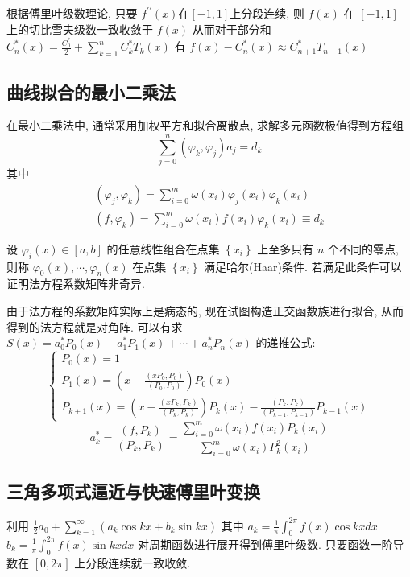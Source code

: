 \documentclass[10pt]{yerbaformat}
\begin{document}
\par 根据傅里叶级数理论, 只要 $f^{\prime \prime}(x)$在$[-1,1]$上分段连续, 则 $f(x)$ 在 $[-1,1]$ 上的切比雪夫级数一致收敛于 $f(x)$ 从而对于部分和 $C_{n}^{*}(x)=\frac{C_{0}^{*}}{2}+\sum_{k=1}^{n} C_{k}^{*} T_{k}(x)$ 有 $f(x)-C_{n}^{*}(x) \approx C_{n+1}^{*} T_{n+1}(x)$

\subsection{曲线拟合的最小二乘法}
\par 在最小二乘法中, 通常采用加权平方和拟合离散点, 求解多元函数极值得到方程组
$$
    \sum_{j=0}^{n}\left(\varphi_{k}, \varphi_{j}\right) a_{j}=d_{k}
$$
其中
$$
    \begin{array}{l}
        \left(\varphi_{j}, \varphi_{k}\right)=\sum_{i=0}^{m} \omega\left(x_{i}\right) \varphi_{j}\left(x_{i}\right) \varphi_{k}\left(x_{i}\right) \\
        \left(f, \varphi_{k}\right)=\sum_{i=0}^{m} \omega\left(x_{i}\right) f\left(x_{i}\right) \varphi_{k}\left(x_{i}\right) \equiv d_{k}
    \end{array}
$$
\begin{definition}
    设 $\varphi_{i}(x) \in[a, b]$ 的任意线性组合在点集 $\left\{x_{i}\right\}$ 上至多只有 $n$ 个不同的零点, 则称 $\varphi_{0}(x), \cdots, \varphi_{n}(x)$ 在点集
    $\left\{x_{i}\right\}$ 满足哈尔(Haar)条件. 若满足此条件可以证明法方程系数矩阵非奇异.
\end{definition}

\par 由于法方程的系数矩阵实际上是病态的, 现在试图构造正交函数族进行拟合, 从而得到的法方程就是对角阵. 可以有求 $S(x)=a_{0}^{*} P_{0}(x)+a_{1}^{*} P_{1}(x)+\cdots+a_{n}^{*} P_{n}(x)$ 的递推公式:
$$
    \left\{\begin{array}{l}
        P_{0}(x)=1                                                                                     \\
        P_{1}(x)=\left(x-\frac{\left(x P_{0}, P_{0}\right)}{\left(P_{0}, P_{0}\right)}\right) P_{0}(x) \\
        P_{k+1}(x)=\left(x-\frac{\left(x P_{k}, P_{k}\right)}{\left(P_{k}, P_{k}\right)}\right) P_{k}(x)-\frac{\left(P_{k}, P_{k}\right)}{\left(P_{k-1}, P_{k-1}\right)} P_{k-1}(x)
    \end{array}\right.
$$
$$
    a_{k}^{*}=\frac{\left(f, P_{k}\right)}{\left(P_{k}, P_{k}\right)}=\frac{\sum_{i=0}^{m} \omega\left(x_{i}\right) f\left(x_{i}\right) P_{k}\left(x_{i}\right)}{\sum_{i=0}^{m} \omega\left(x_{i}\right) P_{k}^{2}\left(x_{i}\right)}
$$

\subsection{三角多项式逼近与快速傅里叶变换}
\par 利用 $\frac{1}{2} a_{0}+\sum_{k=1}^{\infty}\left(a_{k} \cos k x+b_{k} \sin k x\right)$ 其中 $a_{k}=\frac{1}{\pi} \int_{0}^{2 \pi} f(x) \cos k x d x$
$b_{k}=\frac{1}{\pi} \int_{0}^{2 \pi} f(x) \sin k x d x$ 对周期函数进行展开得到傅里叶级数. 只要函数一阶导数在 $[0,2\pi]$ 上分段连续就一致收敛.
\end{document}
